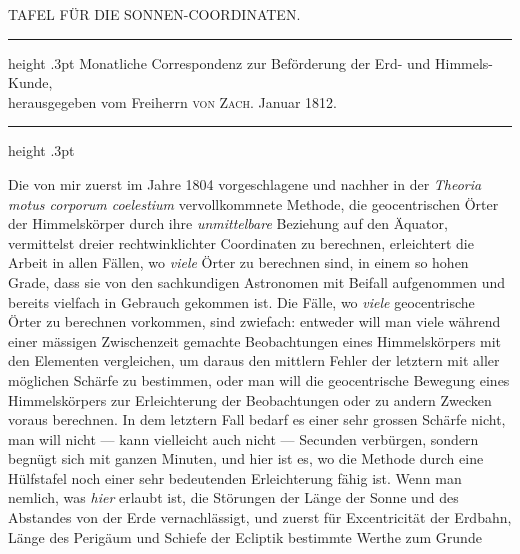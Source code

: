 \par\clearpage
{}
\begingroup
\pagestyle{empty}
\thispagestyle{empty}
%
\vspace*{.17\textheight}
\begin{center}
TAFEL FÜR DIE SONNEN-COORDINATEN.
\end{center}
\begin{center}
\parbox{.79\linewidth}{%
  \centering\fontsize{8}{10}\selectfont\frenchspacing
  \hrule height .3pt\relax\vspace{3pt}
  Monatliche Correspondenz zur Beförderung der Erd- und Himmels-Kunde,\\
  {herausgegeben vom Freiherrn \textsc{von Zach}. Januar 1812.}\par
  \vspace{3pt}\hrule height .3pt\relax
}
\end{center}
\par\indent Die von mir zuerst im Jahre 1804 vorgeschlagene und nachher in der \emph{Theoria motus corporum coelestium} vervollkommnete Methode, die geocentrischen Örter der Himmelskörper durch ihre \emph{unmittelbare} Beziehung auf den Äquator, vermittelst dreier rechtwinklichter Coordinaten zu berechnen, erleichtert die Arbeit in allen Fällen, wo \emph{viele} Örter zu berechnen sind, in einem so hohen Grade, dass sie von den sachkundigen Astronomen mit Beifall aufgenommen und bereits vielfach in Gebrauch gekommen ist. Die Fälle, wo \emph{viele} geocentrische Örter zu berechnen vorkommen, sind zwiefach: entweder will man viele während einer mässigen Zwischenzeit gemachte Beobachtungen eines Himmelskörpers mit den Elementen vergleichen, um daraus den mittlern Fehler der letztern mit aller möglichen Schärfe zu bestimmen, oder man will die geocentrische Bewegung eines Himmelskörpers zur Erleichterung der Beobachtungen oder zu andern Zwecken voraus berechnen. In dem letztern Fall bedarf es einer sehr grossen Schärfe nicht, man will nicht --- kann vielleicht auch nicht --- Secunden verbürgen, sondern begnügt sich mit ganzen Minuten, und hier ist es, wo die Methode durch eine Hülfstafel noch einer sehr bedeutenden Erleichterung fähig ist. Wenn man nemlich, was \emph{hier} erlaubt ist, die Störungen der Länge der Sonne und des Abstandes von der Erde vernachlässigt, und zuerst für Excentricität der Erdbahn, Länge des Perigäum und Schiefe der Ecliptik bestimmte Werthe zum Grunde
\par\clearpage
